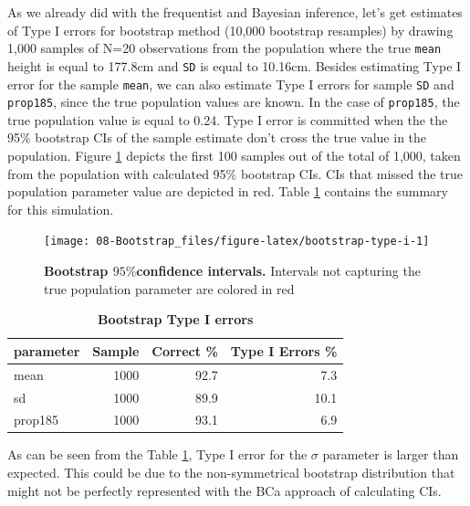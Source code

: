 \documentclass[
]{book}
\begin{document}
As we already did with the frequentist and Bayesian inference, let's get estimates of Type I errors for bootstrap method (10,000 bootstrap resamples) by drawing 1,000 samples of N=20 observations from the population where the true \texttt{mean} height is equal to 177.8cm and \texttt{SD} is equal to 10.16cm. Besides estimating Type I error for the sample \texttt{mean}, we can also estimate Type I errors for sample \texttt{SD} and \texttt{prop185}, since the true population values are known. In the case of \texttt{prop185}, the true population value is equal to 0.24. Type I error is committed when the the 95\% bootstrap CIs of the sample estimate don't cross the true value in the population. Figure \ref{fig:bootstrap-type-i} depicts the first 100 samples out of the total of 1,000, taken from the population with calculated 95\% bootstrap CIs. CIs that missed the true population parameter value are depicted in red. Table \ref{tab:bootstrap-type-i-summary} contains the summary for this simulation.

\begin{figure}

{\centering \texttt{[image: 08-Bootstrap\_files/figure-latex/bootstrap-type-i-1]} 

}

\caption{\textbf{Bootstrap \(95\%\)confidence intervals.} Intervals not capturing the true population parameter are colored in red}\label{fig:bootstrap-type-i}
\end{figure}





\begin{table}

\caption{\label{tab:bootstrap-type-i-summary}\textbf{Bootstrap Type I errors}}
\centering
\begin{tabular}[t]{lrrr}
\toprule
parameter & Sample & Correct \% & Type I Errors \%\\
\midrule
mean & 1000 & 92.7 & 7.3\\
sd & 1000 & 89.9 & 10.1\\
prop185 & 1000 & 93.1 & 6.9\\
\bottomrule
\end{tabular}
\end{table}

As can be seen from the Table \ref{tab:bootstrap-type-i-summary}, Type I error for the \(\sigma\) parameter is larger than expected. This could be due to the non-symmetrical bootstrap distribution that might not be perfectly represented with the BCa approach of calculating CIs.
\end{document}
